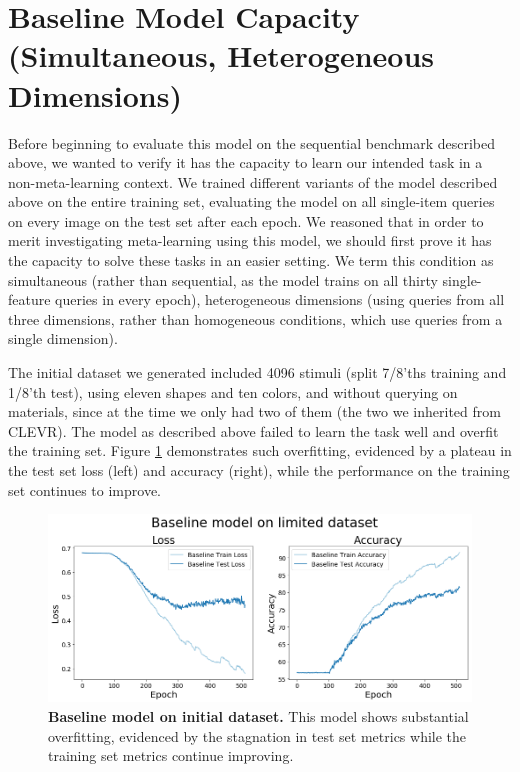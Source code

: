 \FloatBarrier
\section{Baseline Model Capacity (Simultaneous, Heterogeneous Dimensions)\label{res:baseline}}
Before beginning to evaluate this model on the sequential benchmark described above, we wanted to verify it has the capacity to learn our intended task in a non-meta-learning context. We trained different variants of the model described above on the entire training set, evaluating the model on all single-item queries on every image on the test set after each epoch. We reasoned that in order to merit investigating meta-learning using this model, we should first prove it has the capacity to solve these tasks in an easier setting. We term this condition as simultaneous (rather than sequential, as the model trains on all thirty single-feature queries in every epoch), heterogeneous dimensions (using queries from all three dimensions, rather than homogeneous conditions, which use queries from a single dimension).

The initial dataset we generated included 4096 stimuli (split 7/8'ths training and 1/8'th test), using eleven shapes and ten colors, and without querying on materials, since at the time we only had two of them (the two we inherited from CLEVR). The model as described above failed to learn the task well and overfit the training set. Figure \ref{fig:results-baseline-initial-dataset} demonstrates such overfitting, evidenced by a plateau in the test set loss (left) and accuracy (right), while the performance on the training set continues to improve.

\begin{figure}[!htb]
\centering
\includegraphics[width=\linewidth]{ch-results/figures/baseline/initial_dataset.png}
\caption[Baseline model on initial dataset.]{{\bf Baseline model on initial dataset.} This model shows substantial overfitting, evidenced by the stagnation in test set metrics while the training set metrics continue improving.}
\label{fig:results-baseline-initial-dataset}
\end{figure}

